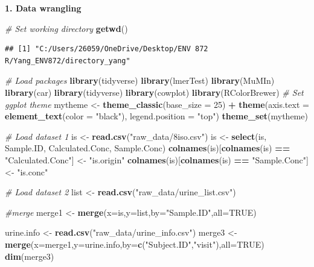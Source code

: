 \documentclass[12pt,]{article}
\newenvironment{Shaded}{\begin{snugshade}}{\end{snugshade}}
\newcommand{\CommentTok}[1]{\textcolor[rgb]{0.56,0.35,0.01}{\textit{#1}}}
\newcommand{\DataTypeTok}[1]{\textcolor[rgb]{0.13,0.29,0.53}{#1}}
\newcommand{\DecValTok}[1]{\textcolor[rgb]{0.00,0.00,0.81}{#1}}
\newcommand{\KeywordTok}[1]{\textcolor[rgb]{0.13,0.29,0.53}{\textbf{#1}}}
\newcommand{\NormalTok}[1]{#1}
\newcommand{\OperatorTok}[1]{\textcolor[rgb]{0.81,0.36,0.00}{\textbf{#1}}}
\newcommand{\OtherTok}[1]{\textcolor[rgb]{0.56,0.35,0.01}{#1}}
\newcommand{\StringTok}[1]{\textcolor[rgb]{0.31,0.60,0.02}{#1}}
\begin{document}
\newpage

\textbf{1. Data wrangling}

\begin{Shaded}
\begin{Highlighting}[]
\CommentTok{# Set working directory}
\KeywordTok{getwd}\NormalTok{()}
\end{Highlighting}
\end{Shaded}

\begin{verbatim}
## [1] "C:/Users/26059/OneDrive/Desktop/ENV 872 R/Yang_ENV872/directory_yang"
\end{verbatim}

\begin{Shaded}
\begin{Highlighting}[]
\CommentTok{# Load packages}
\KeywordTok{library}\NormalTok{(tidyverse)}
\KeywordTok{library}\NormalTok{(lmerTest)}
\KeywordTok{library}\NormalTok{(MuMIn)}
\KeywordTok{library}\NormalTok{(car)}
\KeywordTok{library}\NormalTok{(tidyverse)}
\KeywordTok{library}\NormalTok{(cowplot)}
\KeywordTok{library}\NormalTok{(RColorBrewer)}
\CommentTok{# Set ggplot theme}
\NormalTok{mytheme <-}\StringTok{ }\KeywordTok{theme_classic}\NormalTok{(}\DataTypeTok{base_size =} \DecValTok{25}\NormalTok{) }\OperatorTok{+}
\StringTok{  }\KeywordTok{theme}\NormalTok{(}\DataTypeTok{axis.text =} \KeywordTok{element_text}\NormalTok{(}\DataTypeTok{color =} \StringTok{"black"}\NormalTok{), }
        \DataTypeTok{legend.position =} \StringTok{"top"}\NormalTok{)}
\KeywordTok{theme_set}\NormalTok{(mytheme)}

\CommentTok{# Load dataset 1}
\NormalTok{is <-}\StringTok{ }\KeywordTok{read.csv}\NormalTok{(}\StringTok{"raw_data/8iso.csv"}\NormalTok{)}
\NormalTok{is <-}\StringTok{ }\KeywordTok{select}\NormalTok{(is, Sample.ID, Calculated.Conc, Sample.Conc)}
\KeywordTok{colnames}\NormalTok{(is)[}\KeywordTok{colnames}\NormalTok{(is) }\OperatorTok{==}\StringTok{ "Calculated.Conc"}\NormalTok{] <-}\StringTok{ "is.origin"}
\KeywordTok{colnames}\NormalTok{(is)[}\KeywordTok{colnames}\NormalTok{(is) }\OperatorTok{==}\StringTok{ "Sample.Conc"}\NormalTok{] <-}\StringTok{ "is.conc"}

\CommentTok{# Load dataset 2}
\NormalTok{list <-}\StringTok{ }\KeywordTok{read.csv}\NormalTok{(}\StringTok{"raw_data/urine_list.csv"}\NormalTok{)}

\CommentTok{#merge}
\NormalTok{merge1 <-}\StringTok{ }\KeywordTok{merge}\NormalTok{(}\DataTypeTok{x=}\NormalTok{is,}\DataTypeTok{y=}\NormalTok{list,}\DataTypeTok{by=}\StringTok{"Sample.ID"}\NormalTok{,}\DataTypeTok{all=}\OtherTok{TRUE}\NormalTok{)}

\NormalTok{urine.info <-}\StringTok{ }\KeywordTok{read.csv}\NormalTok{(}\StringTok{"raw_data/urine_info.csv"}\NormalTok{)}
\NormalTok{merge3 <-}\StringTok{ }\KeywordTok{merge}\NormalTok{(}\DataTypeTok{x=}\NormalTok{merge1,}\DataTypeTok{y=}\NormalTok{urine.info,}\DataTypeTok{by=}\KeywordTok{c}\NormalTok{(}\StringTok{"Subject.ID"}\NormalTok{,}\StringTok{"visit"}\NormalTok{),}\DataTypeTok{all=}\OtherTok{TRUE}\NormalTok{)}
\KeywordTok{dim}\NormalTok{(merge3)}
\end{Highlighting}
\end{Shaded}
\end{document}
